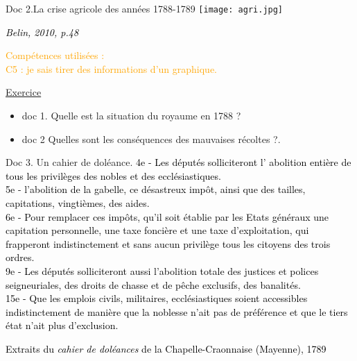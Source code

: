 \documentclass{beamer}
\begin{document}
\begin{frame}
\begin{beamerboxesrounded}[scheme=blocimage]{Doc 2.La crise agricole des années 1788-1789}
\texttt{[image: agri.jpg]}
\begin{flushright}
\textcolor{black}{\small \textit{Belin, 2010, p.48}}
\end{flushright}
\end{beamerboxesrounded}
\end{frame}

\begin{frame}
\begin{flushright}
{\tiny \textcolor{orange}{Compétences utilisées : \\
C5 : je sais tirer des informations d'un graphique.}}
\end{flushright}
\underline{Exercice}
\begin{itemize}
\item doc 1. Quelle est la situation du royaume en 1788 ?
\item doc 2 Quelles sont les conséquences des mauvaises récoltes ?.
\end{itemize}
\end{frame}

\begin{frame}
\begin{beamerboxesrounded}[scheme=blocimage]{Doc 3. Un cahier de doléance.} 
\textcolor{black}{4e - Les députés solliciteront l' abolition entière de tous les privilèges des nobles et des ecclésiastiques.\\
5e - l'abolition de la gabelle, ce désastreux impôt, ainsi que des tailles, capitations, vingtièmes, des aides.\\
6e - Pour remplacer ces impôts, qu'il soit établie par les Etats généraux une capitation personnelle, une taxe foncière et une taxe d'exploitation, qui frapperont indistinctement et sans aucun privilège tous les citoyens des trois ordres.\\
9e - Les députés solliciteront aussi l'abolition totale des justices et polices seigneuriales, des droits de chasse et de pêche exclusifs, des banalités.\\
15e - Que les emplois civils, militaires, ecclésiastiques soient accessibles indistinctement de manière que la noblesse n'ait pas de préférence et que le tiers état n'ait plus d'exclusion.}
\begin{flushright}
\textcolor{black}{Extraits du \textit{cahier de doléances} de la Chapelle-Craonnaise (Mayenne), 1789}
\end{flushright}
\end{beamerboxesrounded}
\end{frame}
\end{document}

